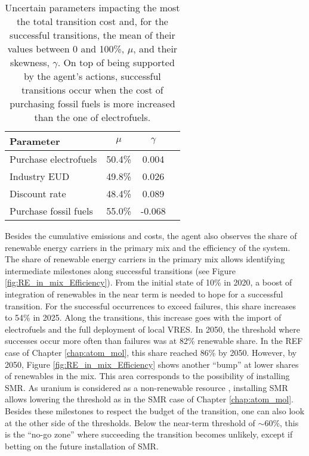 \documentclass[11pt,twoside,a4paper,english]{article}
\begin{document}
\begin{table}[htbp!]
\caption{Uncertain parameters impacting the most the total transition cost and, for the successful transitions, the mean of their values between 0 and 100\%, $\mu$, and their skewness, $\gamma$. On top of being supported by the agent's actions, successful transitions occur when the cost of purchasing fossil fuels is more increased than the one of electrofuels.}
\label{tab:param_RL}
\centering
\begin{tabular}{l c c c}
\toprule
\textbf{Parameter}  & \textbf{$\mu$} & \textbf{$\gamma$}  \\	
\midrule
Purchase electrofuels & 50.4\% & 0.004  \\
Industry EUD & 49.8\% & 0.026 \\
Discount rate & 48.4\% & 0.089\\
Purchase fossil fuels  & 55.0\% & -0.068\\
\bottomrule							

\end{tabular}
\end{table}

Besides the cumulative emissions and costs, the agent also observes the share of renewable energy carriers in the primary mix and the efficiency of the system. The share of renewable energy carriers in the primary mix allows identifying intermediate milestones along successful transitions (see Figure \ref{fig:RE_in_mix_Efficiency}). From the initial state of 10\% in 2020, a boost of integration of renewables in the near term is needed to hope for a successful transition. For the successful occurrences to exceed failures, this share increases to 54\% in 2025. Along the transitions, this increase goes with the import of electrofuels and the full deployment of local \gls{VRES}. In 2050, the threshold where successes occur more often than failures was at 82\% renewable share. In the REF case of Chapter \ref{chap:atom_mol}, this share reached 86\% by 2050. However, by 2050, Figure \ref{fig:RE_in_mix_Efficiency} shows another ``bump'' at lower shares of renewables in the mix. This area corresponds to the possibility of installing \gls{SMR}. As uranium is considered as a non-renewable resource \cite{rixhon2021terminology}, installing \gls{SMR} allows lowering the threshold as in the SMR case of Chapter \ref{chap:atom_mol}. Besides these milestones to respect the  budget of the transition, one can also look at the other side of the thresholds. Below the near-term threshold of $\sim$60\%, this is the ``no-go zone'' where succeeding the transition becomes unlikely, except if betting on the future installation of \gls{SMR}.
\end{document}
